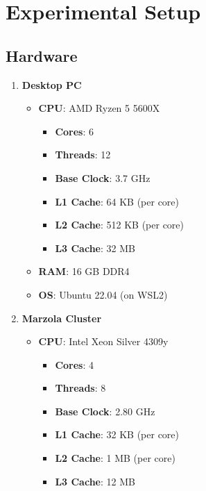 \documentclass{article}
\begin{document}
\section{Experimental Setup}
\subsection{Hardware}
\begin{enumerate}
    \item \textbf{Desktop PC}
    \begin{itemize}
        \item \textbf{CPU}: AMD Ryzen 5 5600X
        \begin{itemize}
            \item \textbf{Cores}: 6
            \item \textbf{Threads}: 12
            \item \textbf{Base Clock}: 3.7 GHz
            \item \textbf{L1 Cache}: 64 KB (per core)
            \item \textbf{L2 Cache}: 512 KB (per core)
            \item \textbf{L3 Cache}: 32 MB
        \end{itemize}
        \item \textbf{RAM}: 16 GB DDR4
        \item \textbf{OS}: Ubuntu 22.04 (on WSL2)
    \end{itemize}
    \item \textbf{Marzola Cluster}
    \begin{itemize}
        \item \textbf{CPU}: Intel Xeon Silver 4309y
        \begin{itemize}
            \item \textbf{Cores}: 4
            \item \textbf{Threads}: 8
            \item \textbf{Base Clock}: 2.80 GHz
            \item \textbf{L1 Cache}: 32 KB (per core)
            \item \textbf{L2 Cache}: 1 MB (per core)
            \item \textbf{L3 Cache}: 12 MB
        \end{itemize}
    \end{itemize}
\end{enumerate}
\end{document}
